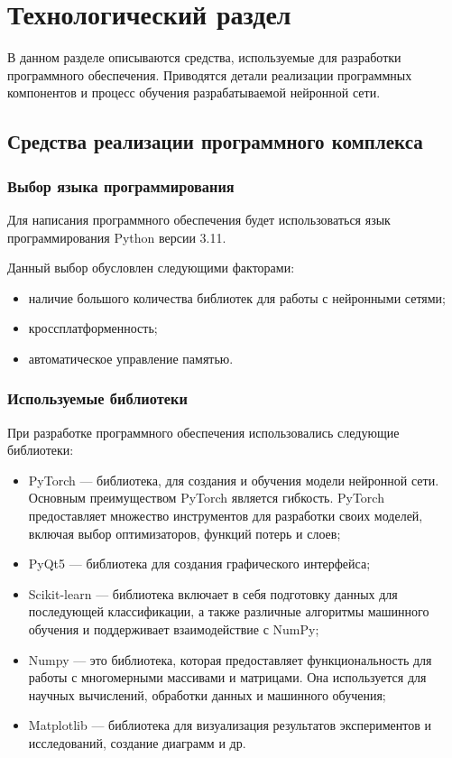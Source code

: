\chapter{Технологический раздел}
В данном разделе описываются средства, используемые для разработки
программного обеспечения. Приводятся детали реализации программных компонентов и процесс
обучения разрабатываемой нейронной сети.

\section{Средства реализации программного комплекса}

\subsection{Выбор языка программирования}
Для написания программного обеспечения будет использоваться язык программирования Python \cite[]{python} версии 3.11.

Данный выбор обусловлен следующими факторами:
\begin{itemize}
    \item наличие большого количества библиотек для работы с нейронными сетями;
    \item кроссплатформенность;
    \item автоматическое управление памятью.
\end{itemize}

\subsection{Используемые библиотеки}
При разработке программного обеспечения использовались следующие
библиотеки:
\begin{itemize}
    \item PyTorch \cite{torch} --- библиотека, для создания и обучения модели нейронной сети. Основным преимуществом PyTorch является гибкость. PyTorch предоставляет множество инструментов для разработки своих моделей, включая выбор оптимизаторов, функций потерь и слоев;
    \item PyQt5 \cite{pyqt} --- библиотека для создания графического интерфейса;
    \item Scikit-learn \cite{scikit}  --- библиотека включает в себя подготовку данных для последующей классификации, а также различные алгоритмы машинного обучения и поддерживает взаимодействие с NumPy;
    \item Numpy \cite{numpy} --- это библиотека, которая предоставляет функциональность для работы с многомерными массивами и матрицами. Она используется для научных вычислений, обработки данных и машинного обучения;
    \item Matplotlib \cite{matplot} --- библиотека для визуализация результатов экспериментов и исследований, создание диаграмм и др.
\end{itemize}

